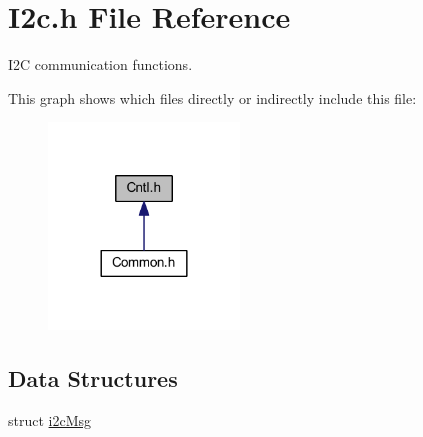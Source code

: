\hypertarget{a00014}{\section{I2c.\-h File Reference}
\label{a00014}
}


I2\-C communication functions.  


This graph shows which files directly or indirectly include this file\-:
\nopagebreak
\begin{figure}[H]
\begin{center}
\leavevmode
\includegraphics[width=144pt]{a00044}
\end{center}
\end{figure}
\subsection*{Data Structures}
\begin{DoxyCompactItemize}
\item 
struct \hyperlink{a00002}{i2c\-Msg}
\end{DoxyCompactItemize}
